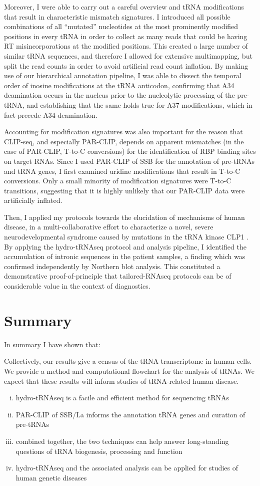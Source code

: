 \documentclass[12pt]{rockefeller}
\begin{document}
Moreover, I were able to carry out a careful overview and tRNA modifications that result in characteristic mismatch signatures. I introduced all possible combinations of all “mutated” nucleotides at the most prominently modified positions in every tRNA in order to collect as many reads that could be having RT misincorporations at the modified positions. This created a large number of similar tRNA sequences, and therefore I allowed for extensive multimapping, but split the read counts in order to avoid artificial read count inflation. By making use of our hierarchical annotation pipeline, I was able to dissect the temporal order of inosine modifications at the tRNA anticodon, confirming that A34 deamination occurs in the nucleus prior to the nucleolytic processing of the pre-tRNA, and establishing that the same holds true for A37 modifications, which in fact precede A34 deamination. 

Accounting for modification signatures was also important for the reason that CLIP-seq, and especially PAR-CLIP, depends on apparent mismatches (in the case of PAR-CLIP, T-to-C conversions) for the identification of RBP binding sites on target RNAs. Since I used PAR-CLIP of SSB for the annotation of pre-tRNAs and tRNA genes, I first examined uridine modifications that result in T-to-C conversions. Only a small minority of modification signatures were T-to-C transitions, suggesting that it is highly unlikely that our PAR-CLIP data were artificially inflated. 

Then, I applied my protocols towards the elucidation of mechanisms of human disease, in a multi-collaborative effort to characterize a novel, severe neurodevelopmental syndrome caused by mutations in the tRNA kinase CLP1 \cite{Karaca:2014em}. By applying the hydro-tRNAseq protocol and analysis pipeline, I identified the accumulation of intronic sequences in the patient samples, a finding which was confirmed independently by Northern blot analysis. This constituted a demonstrative proof-of-principle that tailored-RNAseq protocols can be of considerable value in the context of diagnostics. 

\section{Summary}
In summary I have shown that: 

Collectively, our results give a census of the tRNA transcriptome in human cells. We provide a method and computational flowchart for the analysis of tRNAs. We expect that these results will inform studies of tRNA-related human disease. 
\begin{enumerate}[i)]
\item hydro-tRNAseq is a facile and efficient method for sequencing tRNAs
\item PAR-CLIP of SSB/La informs the annotation tRNA genes and curation of pre-tRNAs
\item combined together, the two techniques can help answer long-standing questions of tRNA biogenesis, processing and function
\item hydro-tRNAseq and the associated analysis can be applied for studies of human genetic diseases
\end{enumerate}
\end{document}
